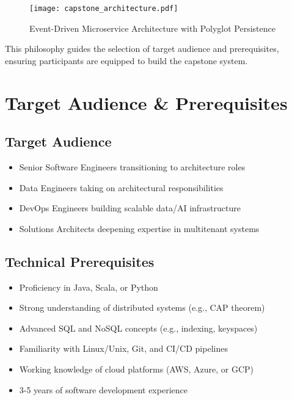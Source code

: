 \documentclass[11pt]{article}
\begin{document}
\begin{figure}[h]
    \centering
    \texttt{[image: capstone\_architecture.pdf]}
    \caption{Event-Driven Microservice Architecture with Polyglot Persistence}
\end{figure}

This philosophy guides the selection of target audience and prerequisites, ensuring participants are equipped to build the capstone system.

\section{Target Audience \& Prerequisites}

\subsection{Target Audience}
\begin{itemize}
    \item Senior Software Engineers transitioning to architecture roles
    \item Data Engineers taking on architectural responsibilities
    \item DevOps Engineers building scalable data/AI infrastructure
    \item Solutions Architects deepening expertise in multitenant systems
\end{itemize}

\subsection{Technical Prerequisites}
\begin{itemize}
    \item Proficiency in Java, Scala, or Python
    \item Strong understanding of distributed systems (e.g., CAP theorem)
    \item Advanced SQL and NoSQL concepts (e.g., indexing, keyspaces)
    \item Familiarity with Linux/Unix, Git, and CI/CD pipelines
    \item Working knowledge of cloud platforms (AWS, Azure, or GCP)
    \item 3-5 years of software development experience
\end{itemize}
\end{document}
